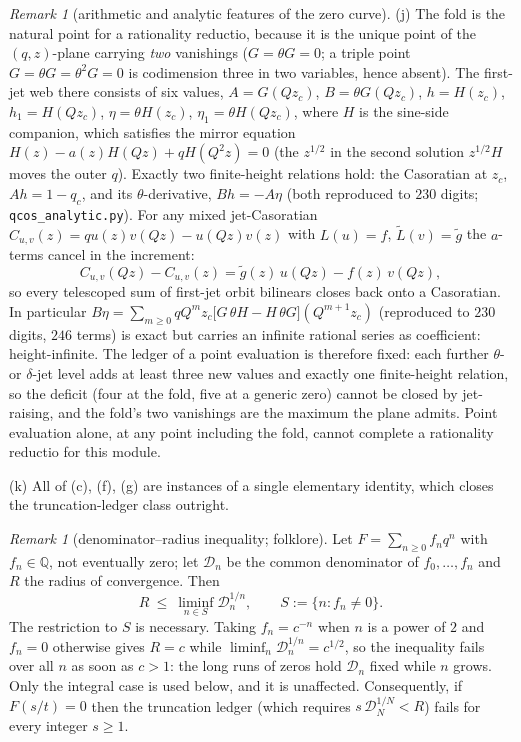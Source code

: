 \documentclass[11pt]{article}
\theoremstyle{plain}
\theoremstyle{definition}
\theoremstyle{remark}
\newtheorem{remark}[theorem]{Remark}
\newcommand{\Q}{\mathbb{Q}}
\begin{document}
\begin{remark}[arithmetic and analytic features of the zero curve]
(j) The fold is the natural point for a rationality reductio, because it is the unique point of
the $(q,z)$-plane carrying \emph{two} vanishings ($G=\theta G=0$; a triple point $G=\theta
G=\theta^2G=0$ is codimension three in two variables, hence absent). The first-jet web there
consists of six values, $A=G(Qz_c)$, $B=\theta G(Qz_c)$, $h=H(z_c)$, $h_1=H(Qz_c)$, $\eta=\theta
H(z_c)$, $\eta_1=\theta H(Qz_c)$, where $H$ is the sine-side companion, which satisfies the mirror
equation $H(z)-a(z)H(Qz)+qH(Q^2z)=0$ (the $z^{1/2}$ in the second solution $z^{1/2}H$ moves the
outer $q$). Exactly two finite-height relations hold: the Casoratian at $z_c$, $Ah=1-q_c$, and its
$\theta$-derivative, $Bh=-A\eta$ (both reproduced to $230$ digits;
\texttt{qcos\_analytic.py}). For any mixed jet-Casoratian
$C_{u,v}(z)=qu(z)v(Qz)-u(Qz)v(z)$ with $L(u)=f$, $\widetilde L(v)=\tilde g$ the $a$-terms cancel
in the increment:
\[
   C_{u,v}(Qz)-C_{u,v}(z)=\tilde g(z)\,u(Qz)-f(z)\,v(Qz),
\]
so every telescoped sum of first-jet orbit bilinears closes back onto a Casoratian. In particular
$B\eta=\sum_{m\ge0}qQ^mz_c\bigl[G\,\theta H-H\,\theta G\bigr](Q^{m+1}z_c)$ (reproduced to
$230$ digits, $246$ terms) is exact but carries an infinite rational series as coefficient: height-infinite.
The ledger of a point evaluation is therefore fixed: each further $\theta$- or
$\delta$-jet level adds at least three new values and exactly one finite-height relation, so the
deficit (four at the fold, five at a generic zero) cannot be closed by jet-raising, and the fold's
two vanishings are the maximum the plane admits. Point evaluation alone, at any point including the
fold, cannot complete a rationality reductio for this module.

(k) All of (c), (f), (g) are instances of a single elementary identity, which closes the
truncation-ledger class outright.

\begin{remark}[denominator--radius inequality; folklore]\label{prop:denrad}
Let $F=\sum_{n\ge0}f_nq^n$ with $f_n\in\Q$, not eventually zero; let $\mathcal D_n$ be the common
denominator of $f_0,\dots,f_n$ and $R$ the radius of convergence. Then
\[
   R\ \le\ \liminf_{n\in S}\mathcal D_n^{1/n},\qquad S:=\{n:f_n\ne0\}.
\]
The restriction to $S$ is necessary. Taking $f_n=c^{-n}$ when $n$ is a power of $2$ and $f_n=0$
otherwise gives $R=c$ while $\liminf_n\mathcal D_n^{1/n}=c^{1/2}$, so the inequality fails over all
$n$ as soon as $c>1$: the long runs of zeros hold $\mathcal D_n$ fixed while $n$ grows. Only the
integral case is used below, and it is unaffected.
Consequently, if $F(s/t)=0$ then the truncation ledger (which requires
$s\,\mathcal D_N^{1/N}<R$) fails for every integer $s\ge1$.
\end{remark}


\end{remark}
\end{document}
